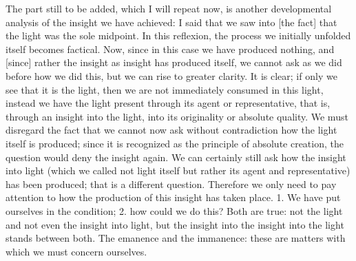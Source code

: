 The part still to be added, which I will repeat now,
is another developmental analysis of the insight we have achieved:
I said that we saw into [the fact] that the light was the sole midpoint.
In this reflexion, the process we initially unfolded itself becomes factical.
Now, since in this case we have produced nothing,
and [since] rather the insight as insight has produced itself,
we cannot ask as we did before how we did this,
but we can rise to greater clarity.
It is clear; if only we see that it is the light,
then we are not immediately consumed in this light,
instead we have the light present
through its agent or representative,
that is, through an insight into the light,
into its originality or absolute quality.
We must disregard the fact that
we cannot now ask without contradiction
how the light itself is produced;
since it is recognized as the principle of absolute creation,
the question would deny the insight again.
We can certainly still ask how the insight into light
(which we called not light itself
but rather its agent and representative)
has been produced; that is a different question.
Therefore we only need to pay
attention to how the production of this insight has taken place.
1. We have put ourselves in the condition;
2. how could we do this?
Both are true:
not the light and not even the insight into light,
but the insight into the insight into the light
stands between both.
The emanence and the immanence:
these are matters with which we must concern ourselves.

